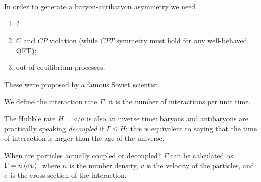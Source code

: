 \documentclass[main.tex]{subfiles}
\begin{document}

%
%

In order to generate a baryon-antibaryon asymmetry we need \begin{enumerate}
    \item ?
    \item \(C\) and \(CP\) violation (while \(CPT\) symmetry must hold for any well-behaved QFT);
    \item out-of-equilibrium processes.
\end{enumerate}

These were proposed by a famous Soviet scientist.

We define the interaction rate \(\Gamma \): it is the number of interactions per unit time.

The Hubble rate \(H = \dot{a} / a \) is also an inverse time: baryons and antibaryons are practically speaking \emph{decoupled} if \(\Gamma \leq H\): this is equivalent to saying that the time of interaction is larger than the age of the universe.

When are particles actually coupled or decoupled?
\(\Gamma \) can be calculated as \(\Gamma = n \expval{\sigma v}\), where \(n\) is the number density, \(v\) is the velocity of the particles, and \(\sigma \) is the cross section of the interaction.
\end{document}

